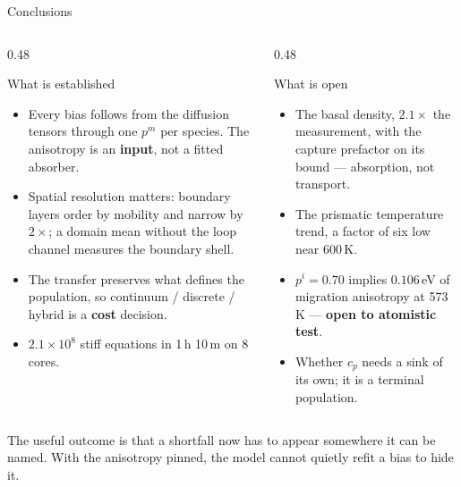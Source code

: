 \documentclass[aspectratio=169,10pt]{beamer}
\newcommand{\foot}[1]{\par\vspace{1ex}%
  \begingroup\footnotesize\raggedright #1\par\endgroup}
\begin{document}
\begin{frame}{Conclusions}
\begin{columns}[T]
\begin{column}{0.48\textwidth}
\begin{block}{What is established}\small
\begin{itemize}
  \item Every bias follows from the diffusion tensors through one $p^{m}$ per
        species. The anisotropy is an \textbf{input}, not a fitted absorber.
  \item Spatial resolution matters: boundary layers order by mobility and
        narrow by $2\times$; a domain mean without the loop channel measures
        the boundary shell.
  \item The transfer preserves what defines the population, so
        continuum / discrete / hybrid is a \textbf{cost} decision.
  \item $2.1\times10^{8}$ stiff equations in 1\,h 10\,m on 8 cores.
\end{itemize}
\end{block}
\end{column}
\begin{column}{0.48\textwidth}
\begin{block}{What is open}\small
\begin{itemize}
  \item The basal density, $2.1\times$ the measurement, with the capture
        prefactor on its bound --- absorption, not transport.
  \item The prismatic temperature trend, a factor of six low near 600\,K.
  \item $p^{i}=0.70$ implies $0.106$\,eV of migration anisotropy at 573\,K ---
        \textbf{open to atomistic test}.
  \item Whether $c_p$ needs a sink of its own; it is a terminal population.
\end{itemize}
\end{block}
\end{column}
\end{columns}
\foot{The useful outcome is that a shortfall now has to appear somewhere it can
be named. With the anisotropy pinned, the model cannot quietly refit a bias to
hide it.}
\end{frame}
\end{document}
